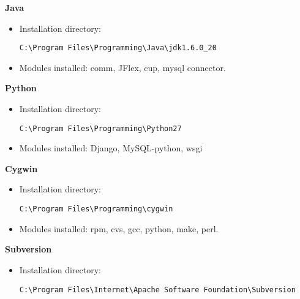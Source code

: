 \textbf{Java}
\begin{itemize}
\item Installation directory: \begin{verbatim}C:\Program Files\Programming\Java\jdk1.6.0_20\end{verbatim}
\item Modules installed: comm, JFlex, cup, mysql connector.
\end{itemize}
\textbf{Python}
\begin{itemize}
\item Installation directory: \begin{verbatim}C:\Program Files\Programming\Python27\end{verbatim}
\item Modules installed: Django, MySQL-python, wsgi
\end{itemize}
\textbf{Cygwin}
\begin{itemize}
\item Installation directory: \begin{verbatim}C:\Program Files\Programming\cygwin\end{verbatim}
\item Modules installed: rpm, cvs, gcc, python, make, perl.
\end{itemize}
\textbf{Subversion}
\begin{itemize}
\item Installation directory: \begin{verbatim}C:\Program Files\Internet\Apache Software Foundation\Subversion\end{verbatim}
\end{itemize}